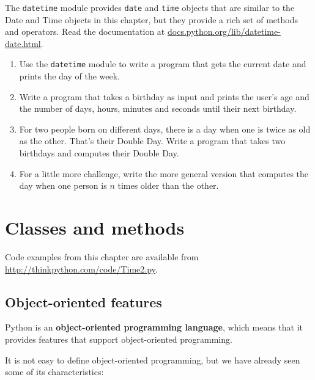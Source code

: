 \documentclass[10pt]{book}
\begin{document}
\begin{CJK}{UTF8}{gbsn}
\begin{exercise}

The {\tt datetime} module provides {\tt date} and {\tt time} objects
that are similar to the Date and Time objects in this chapter, but
they provide a rich set of methods and operators.  Read the
documentation at \url{docs.python.org/lib/datetime-date.html}.

\begin{enumerate}

\item Use the {\tt datetime} module to write a program that gets the
  current date and prints the day of the week.

\item Write a program that takes a birthday as input and prints the
  user's age and the number of days, hours, minutes and seconds until
  their next birthday.

\item For two people born on different days, there is a day when one
  is twice as old as the other. That's their Double Day.  Write a
  program that takes two birthdays and computes their Double Day.

\item For a little more challenge, write the more general version that
  computes the day when one person is $n$ times older than the other.

\end{enumerate}

\end{exercise}


\chapter{Classes and methods}

Code examples from this chapter are available from
\url{http://thinkpython.com/code/Time2.py}.

\section{Object-oriented features}

Python is an {\bf object-oriented programming language}, which means
that it provides features that support object-oriented
programming.

It is not easy to define object-oriented programming, but we have
already seen some of its characteristics:


\end{CJK}
\end{document}

